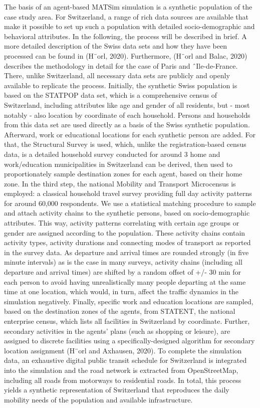 \documentclass[a4paper]{article}
\begin{document}
The basis of an agent-based MATSim simulation is a synthetic population of the case study area. For Switzerland, a range of rich
data sources are available that make it possible to set up such a population with detailed socio-demographic and behavioral attributes.
In the following, the process will be described in brief. A more detailed description of the Swiss data sets and how they have been
processed can be found in (H¨orl, 2020). Furthermore, (H¨orl and Balac, 2020) describes the methodology in detail for the case of Paris
and ˆIle-de-France. There, unlike Switzerland, all necessary data sets are publicly and openly available to replicate the process.
Initially, the synthetic Swiss population is based on the STATPOP data set, which is a comprehensive census of Switzerland,
including attributes like age and gender of all residents, but - most notably - also location by coordinate of each household. Persons and
households from this data set are used directly as a basis of the Swiss synthetic population. Afterward, work or educational locations for
each synthetic person are added. For that, the Structural Survey is used, which, unlike the registration-based census data, is a detailed
household survey conducted for around 3%
home and work/education municipalities in Switzerland can be derived, then used to proportionately sample destination zones for
each agent, based on their home zone. In the third step, the national Mobility and Transport Microcensus is employed: a classical
household travel survey providing full day activity patterns for around 60,000 respondents. We use a statistical matching procedure to
sample and attach activity chains to the synthetic persons, based on socio-demographic attributes. This way, activity patterns
correlating with certain age groups or gender are assigned according to the population. These activity chains contain activity types,
activity durations and connecting modes of transport as reported in the survey data. As departure and arrival times are rounded
strongly (in five minute intervals) as is the case in many surveys, activity chains (including all departure and arrival times) are shifted
by a random offset of +/- 30 min for each person to avoid having unrealistically many people departing at the same time at one
location, which would, in turn, affect the traffic dynamics in the simulation negatively. Finally, specific work and education locations
are sampled, based on the destination zones of the agents, from STATENT, the national enterprise census, which lists all facilities in
Switzerland by coordinate. Further, secondary activities in the agents’ plans (such as shopping or leisure), are assigned to discrete
facilities using a specifically-designed algorithm for secondary location assignment (H¨orl and Axhausen, 2020). To complete the
simulation data, an exhaustive digital public transit schedule for Switzerland is integrated into the simulation and the road network is
extracted from OpenStreetMap, including all roads from motorways to residential roads. In total, this process yields a synthetic
representation of Switzerland that reproduces the daily mobility needs of the population and available infrastructure.
\end{document}
